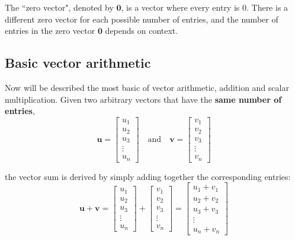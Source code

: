 \documentclass{article}
\begin{document}
The ``zero vector", denoted by \(\mathbf{0}\), is a vector where every entry is \(0\). There is a different zero vector for each possible number of entries, and the number of entries in the zero vector \(\mathbf{0}\) depends on context. 




\subsection*{Basic vector arithmetic}

Now will be described the most basic of vector arithmetic, addition and scalar multiplication. Given two arbitrary vectors that have the {\bf same number of entries}, 
\[\mathbf{u} = \begin{bmatrix} u_1 \\ u_2 \\ u_3 \\ \vdots \\ u_n \end{bmatrix} \quad\text{and}\quad \mathbf{v} = \begin{bmatrix} v_1 \\ v_2 \\ v_3 \\ \vdots \\ v_n \end{bmatrix}\]

the vector sum is derived by simply adding together the corresponding entries:
\[\mathbf{u} + \mathbf{v} = \begin{bmatrix} u_1 \\ u_2 \\ u_3 \\ \vdots \\ u_n \end{bmatrix} + \begin{bmatrix} v_1 \\ v_2 \\ v_3 \\ \vdots \\ v_n \end{bmatrix} = \begin{bmatrix} u_1 + v_1 \\ u_2 + v_2 \\ u_3 + v_3 \\ \vdots \\ u_n + v_n \end{bmatrix}\]
\end{document}
